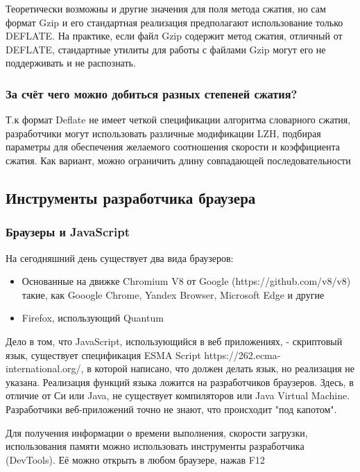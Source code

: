 \documentclass[12pt]{article}
\begin{document}
Теоретически возможны и другие значения для поля метода сжатия,
но сам формат Gzip и его стандартная реализация предполагают использование только DEFLATE.
На практике, если файл Gzip содержит метод сжатия, отличный от DEFLATE,
стандартные утилиты для работы с файлами Gzip могут его не поддерживать и не распознать.

\subsubsection{За счёт чего можно добиться разных степеней сжатия?}

Т.к формат Deflate не имеет четкой спецификации алгоритма словарного сжатия,
разработчики могут использовать различные модификации LZH, подбирая параметры для
обеспечения желаемого соотношения скорости и коэффициента сжатия.
Как вариант, можно ограничить длину совпадающей последовательности

\subsection{Инструменты разработчика браузера}

\subsubsection{Браузеры и JavaScript}

На сегодняшний день существует два вида браузеров:

\begin{itemize}[label=-]
    \item Основанные на движке Chromium V8 от Google (https://github.com/v8/v8) такие,
          как Gooogle Chrome, Yandex Browser, Microsoft Edge и другие
    \item Firefox, использующий Quantum
\end{itemize}

Дело в том, что JavaScript, использующийся в веб приложениях,
- скриптовый язык, существует спецификация ESMA Script https://262.ecma-international.org/,
в которой написано, что должен делать язык, но реализация не указана.
Реализация функций языка ложится на разработчиков браузеров.
Здесь, в отличие от Си или Java, не существует компиляторов или Java Virtual Machine.
Разработчики веб-приложений точно не знают, что происходит "под капотом".

Для получения информации о времени выполнения, скорости загрузки,
использования памяти можно использовать инструменты разработчика (DevTools).
Её можно открыть в любом браузере, нажав F12
\end{document}
